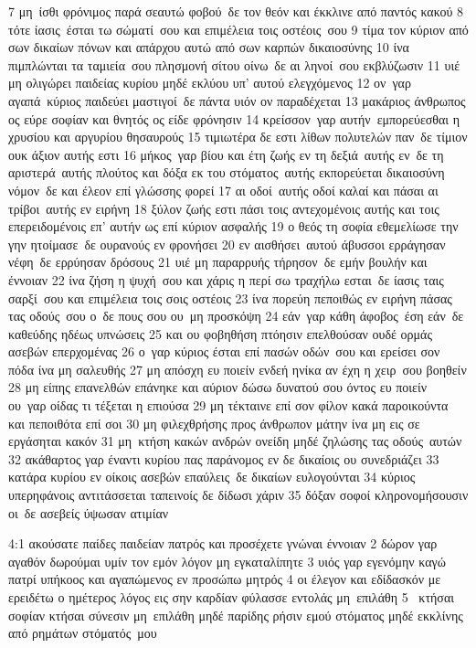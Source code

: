 \documentclass[10pt,oneside,footinclude=true,headinclude=true]{scrbook} %
\begin{document}
7 μη ίσθι φρόνιμος παρά σεαυτώ φοβού δε τον θεόν και έκκλινε από παντός κακού
8 τότε ίασις έσται τω σώματί σου και επιμέλεια τοις οστέοις σου
9 τίμα τον κύριον από σων δικαίων πόνων και απάρχου αυτώ από σων καρπών δικαιοσύνης
10 ίνα πιμπλώνται τα ταμιεία σου πλησμονή σίτου οίνω δε αι ληνοί σου εκβλύζωσιν
11 υιέ μη ολιγώρει παιδείας κυρίου μηδέ εκλύου υπ' αυτού ελεγχόμενος
12 ον γαρ αγαπά κύριος παιδεύει μαστιγοί δε πάντα υιόν ον παραδέχεται
13 μακάριος άνθρωπος ος εύρε σοφίαν και θνητός ος είδε φρόνησιν
14 κρείσσον γαρ αυτήν εμπορεύεσθαι η χρυσίου και αργυρίου θησαυρούς
15 τιμιωτέρα δε εστι λίθων πολυτελών παν δε τίμιον ουκ άξιον αυτής εστι
16 μήκος γαρ βίου και έτη ζωής εν τη δεξιά αυτής εν δε τη αριστερά αυτής πλούτος και δόξα εκ του στόματος αυτής εκπορεύεται δικαιοσύνη νόμον δε και έλεον επί γλώσσης φορεί
17 αι οδοί αυτής οδοί καλαί και πάσαι αι τρίβοι αυτής εν ειρήνη
18 ξύλον ζωής εστι πάσι τοις αντεχομένοις αυτής και τοις επερειδομένοις επ' αυτήν ως επί κύριον ασφαλής
19 ο θεός τη σοφία εθεμελίωσε την γην ητοίμασε δε ουρανούς εν φρονήσει
20 εν αισθήσει αυτού άβυσσοι ερράγησαν νέφη δε ερρύησαν δρόσους
21 υιέ μη παραρρυής τήρησον δε εμήν βουλήν και έννοιαν
22 ίνα ζήση η ψυχή σου και χάρις η περί σω τραχήλω εσται δε ίασις ταις σαρξί σου και επιμέλεια τοις σοις οστέοις
23 ίνα πορεύη πεποιθώς εν ειρήνη πάσας τας οδούς σου ο δε πους σου ου μη προσκόψη
24 εάν γαρ κάθη άφοβος έση εάν δε καθεύδης ηδέως υπνώσεις
25 και ου φοβηθήση πτόησιν επελθούσαν ουδέ ορμάς ασεβών επερχομένας
26 ο γαρ κύριος έσται επί πασών οδών σου και ερείσει σον πόδα ίνα μη σαλευθής
27 μη απόσχη ευ ποιείν ενδεή ηνίκα αν έχη η χειρ σου βοηθείν
28 μη είπης επανελθών επάνηκε και αύριον δώσω δυνατού σου όντος ευ ποιείν ου γαρ οίδας τι τέξεται η επιούσα
29 μη τέκταινε επί σον φίλον κακά παροικούντα και πεποιθότα επί σοι
30 μη φιλεχθρήσης προς άνθρωπον μάτην ίνα μη εις σε εργάσηται κακόν
31 μη κτήση κακών ανδρών ονείδη μηδέ ζηλώσης τας οδούς αυτών
32 ακάθαρτος γαρ έναντι κυρίου πας παράνομος εν δε δικαίοις ου συνεδριάζει
33 κατάρα κυρίου εν οίκοις ασεβών επαύλεις δε δικαίων ευλογούνται
34 κύριος υπερηφάνοις αντιτάσσεται ταπεινοίς δε δίδωσι χάριν
35 δόξαν σοφοί κληρονομήσουσιν οι δε ασεβείς ύψωσαν ατιμίαν
\par
4:1 ακούσατε παίδες παιδείαν πατρός και προσέχετε γνώναι έννοιαν
2 δώρον γαρ αγαθόν δωρούμαι υμίν τον εμόν λόγον μη εγκαταλίπητε
3 υιός γαρ εγενόμην καγώ πατρί υπήκοος και αγαπώμενος εν προσώπω μητρός
4 οι έλεγον και εδίδασκόν με ερειδέτω ο ημέτερος λόγος εις σην καρδίαν φύλασσε εντολάς μη επιλάθη
5  κτήσαι σοφίαν κτήσαι σύνεσιν μη επιλάθη μηδέ παρίδης ρήσιν εμού στόματος μηδέ εκκλίνης από ρημάτων στόματός μου
\end{document}
